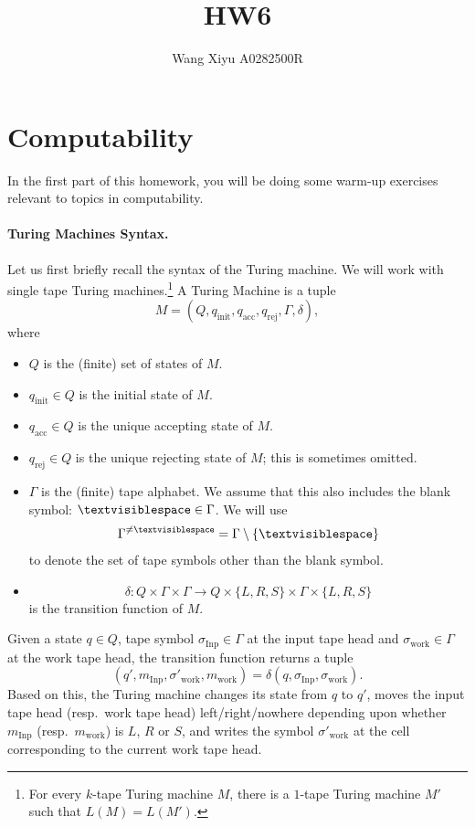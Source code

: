 \documentclass{article}
\begin{document}
\title{HW6}
\author{Wang Xiyu A0282500R}
\date{}
\maketitle
\section*{Computability}

In the first part of this homework, you will be doing some warm-up exercises relevant to topics in computability.

\paragraph{Turing Machines Syntax.}
Let us first briefly recall the syntax of the Turing machine. We will work with single tape Turing machines.\footnote{For every $k$-tape Turing machine $M$, there is a $1$-tape Turing machine $M'$ such that $L(M)=L(M')$.}
A Turing Machine is a tuple
\[
M = (Q, q_{\mathrm{init}}, q_{\mathrm{acc}}, q_{\mathrm{rej}}, \Gamma, \delta),
\]
where
\begin{itemize}
    \item $Q$ is the (finite) set of states of $M$.
    \item $q_{\mathrm{init}} \in Q$ is the initial state of $M$.
    \item $q_{\mathrm{acc}} \in Q$ is the unique accepting state of $M$.
    \item $q_{\mathrm{rej}} \in Q$ is the unique rejecting state of $M$; this is sometimes omitted.
    \item $\Gamma$ is the (finite) tape alphabet. We assume that this also includes the blank symbol: $\textvisiblespace \in \Gamma$. We will use
    \[
    \Gamma^{\neq \textvisiblespace} = \Gamma \setminus \{\textvisiblespace\}
    \]
    to denote the set of tape symbols other than the blank symbol.
    \item
    \[
    \delta : Q \times \Gamma \times \Gamma \to Q \times \{L,R,S\} \times \Gamma \times \{L,R,S\}
    \]
    is the transition function of $M$.
\end{itemize}

Given a state $q \in Q$, tape symbol $\sigma_{\mathrm{Inp}} \in \Gamma$ at the input tape head and $\sigma_{\mathrm{work}} \in \Gamma$ at the work tape head, the transition function returns a tuple
\[
(q', m_{\mathrm{Inp}}, \sigma'_{\mathrm{work}}, m_{\mathrm{work}})
= \delta(q,\sigma_{\mathrm{Inp}},\sigma_{\mathrm{work}}).
\]
Based on this, the Turing machine changes its state from $q$ to $q'$, moves the input tape head (resp.\ work tape head) left/right/nowhere depending upon whether $m_{\mathrm{Inp}}$ (resp.\ $m_{\mathrm{work}}$) is $L$, $R$ or $S$, and writes the symbol $\sigma'_{\mathrm{work}}$ at the cell corresponding to the current work tape head.
\end{document}
